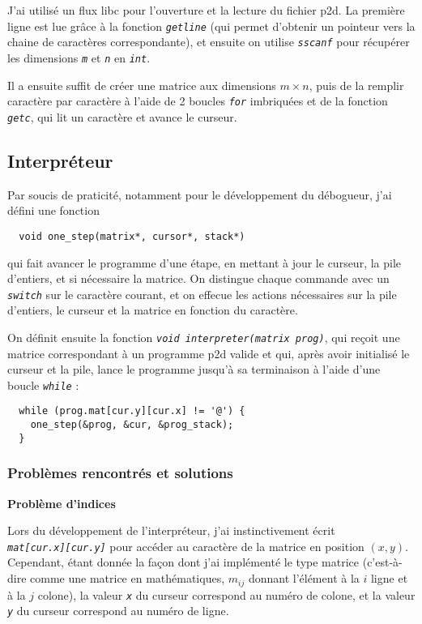 \documentclass[a4paper,11pt]{article}
\newcommand{\code}[1]{{\itshape\lstinline{#1}}}
\begin{document}
J'ai utilisé un flux libc pour l'ouverture et la lecture du fichier p2d. La première ligne est lue grâce à la fonction \code{getline} (qui permet d'obtenir un pointeur vers la chaine de caractères correspondante), et ensuite on utilise \code{sscanf} pour récupérer les dimensions \code{m} et \code{n} en \code{int}.

Il a ensuite suffit de créer une matrice aux dimensions $m \times n$, puis de la remplir caractère par caractère à l'aide de 2 boucles \code{for} imbriquées et de la fonction \code{getc}, qui lit un caractère et avance le curseur.


\subsection*{Interpréteur}

Par soucis de praticité, notamment pour le développement du débogueur, j'ai défini une fonction
\begin{lstlisting}
  void one_step(matrix*, cursor*, stack*)
\end{lstlisting}
qui fait avancer le programme d'une étape, en mettant à jour le curseur, la pile d'entiers, et si nécessaire la matrice.
On distingue chaque commande avec un \code{switch} sur le caractère courant, et on effecue les actions nécessaires sur la pile d'entiers, le curseur et la matrice en fonction du caractère.

On définit ensuite la fonction \code{void interpreter(matrix prog)}, qui reçoit une matrice correspondant à un programme p2d valide et qui, après avoir initialisé le curseur et la pile, lance le programme jusqu'à sa terminaison à l'aide d'une boucle \code{while} :
\begin{lstlisting}
  while (prog.mat[cur.y][cur.x] != '@') {
    one_step(&prog, &cur, &prog_stack);
  }
\end{lstlisting}

\subsubsection*{Problèmes rencontrés et solutions}

{\small\textbf{Problème d'indices}}

Lors du développement de l'interpréteur, j'ai instinctivement écrit \\\code{mat[cur.x][cur.y]} pour accéder au caractère de la matrice en position $(x, y)$. Cependant, étant donnée la façon dont j'ai implémenté le type matrice (c'est-à-dire comme une matrice en mathématiques, $m_{ij}$ donnant l'élément à la $i$ ligne et à la $j$ colone), la valeur \code{x} du curseur correspond au numéro de colone, et la valeur \code{y} du curseur correspond au numéro de ligne.
\end{document}
